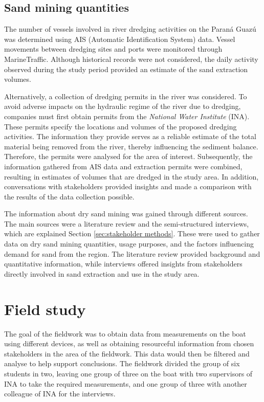 \subsection{Sand mining quantities}
The number of vessels involved in river dredging activities on the Paraná Guazú was determined using AIS (Automatic Identification System) data. Vessel movements between dredging sites and ports were monitored through MarineTraffic. Although historical records were not considered, the daily activity observed during the study period provided an estimate of the sand extraction volumes. 

Alternatively, a collection of dredging permits in the river was considered. To avoid adverse impacts on the hydraulic regime of the river due to dredging, companies must first obtain permits from the \textit{National Water Institute }(INA). These permits specify the locations and volumes of the proposed dredging activities. The information they provide serves as a reliable estimate of the total material being removed from the river, thereby influencing the sediment balance. Therefore, the permits were analysed for the area of interest.
Subsequently, the information gathered from AIS data and extraction permits were combined, resulting in estimates of volumes that are dredged in the study area. In addition, conversations with stakeholders provided insights and made a comparison with the results of the data collection possible.

The information about dry sand mining was gained through different sources. The main sources were a literature review and the semi-structured interviews, which are explained Section \ref{sec:stakeholder methods}. These were used to gather data on dry sand mining quantities, usage purposes, and the factors influencing demand for sand from the region. The literature review provided background and quantitative information, while interviews offered insights from stakeholders directly involved in sand extraction and use in the study area.

\section{Field study}
\label{sec:field study}
The goal of the fieldwork was to obtain data from measurements on the boat using different devices, as well as obtaining resourceful information from chosen stakeholders in the area of the fieldwork. This data would then be filtered and analyse to help support conclusions. The fieldwork divided the group of six students in two, leaving one group of three on the boat with two supervisors of INA to take the required measurements, and one group of three with another colleague of INA for the interviews.

